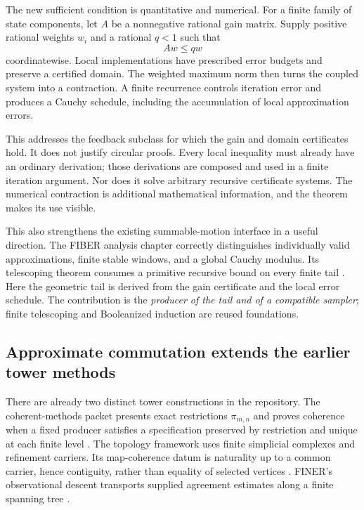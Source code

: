 The new sufficient condition is quantitative and numerical.
For a finite family of state components, let \(A\) be a nonnegative rational
gain matrix. Supply positive rational weights \(w_i\) and a rational
\(q<1\) such that
\[
                     Aw\le q w
\]
coordinatewise. Local implementations have prescribed error budgets and
preserve a certified domain. The weighted maximum norm then turns the
coupled system into a contraction. A finite recurrence controls
iteration error and produces a Cauchy schedule, including the accumulation
of local approximation errors.

This addresses the feedback subclass for which the gain and domain
certificates hold. It does not justify circular proofs. Every local
inequality must already have an ordinary derivation; those derivations
are composed and used in a finite iteration argument. Nor does it solve
arbitrary recursive certificate systems. The numerical contraction is
additional mathematical information, and the theorem makes its use
visible.

This also strengthens the existing summable-motion interface in a useful
direction. The FIBER analysis chapter correctly distinguishes individually
valid approximations, finite stable windows, and a global Cauchy modulus.
Its telescoping theorem consumes a primitive recursive bound on every
finite tail \cite{audit-fiber}. Here the geometric tail is derived from
the gain certificate and the local error schedule. The contribution is the
\emph{producer of the tail and of a compatible sampler}; finite
telescoping and Booleanized induction are reused foundations.

\subsection{Approximate commutation extends the earlier tower methods}

There are already two distinct tower constructions in the repository.
The coherent-methods packet presents exact restrictions
\(\pi_{m,n}\) and proves coherence when a fixed producer satisfies a
specification preserved by restriction and unique at each finite level
\cite{audit-coherent}.
The topology framework uses finite simplicial complexes and refinement
carriers. Its map-coherence datum is naturality up to a common carrier,
hence contiguity, rather than equality of selected vertices
\cite{audit-topology}.
FINER's observational descent transports supplied agreement estimates
along a finite spanning tree \cite{audit-finer}.

